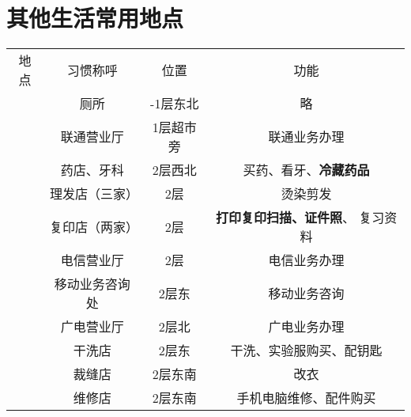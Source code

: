 \section[其他生活常用地点]{其他生活常用地点}
\label{common_locations}
\begin{table}[H]
    \centering
    \begin{tabular}{|c|c|c|c|}
        \Xhline{1.2pt}
        地点                    & 习惯称呼                  & 位置         & 功能                           \\
        \Xhline{1.2pt}
        \multirow{16}{*}{大服}  & 厕所                    & -1层东北      & 略                            \\
        \cline{2-4}
                              & 联通营业厅                 & 1层超市旁      & 联通业务办理                       \\
        \cline{2-4}
                              & 药店、牙科                 & 2层西北       &                              %
        买药、看牙、\textbf{冷藏药品}                                                                       \\
        \cline{2-4}
                              & 理发店（三家）               & 2层         & 烫染剪发                         \\
        \cline{2-4}
                              & 复印店（两家）               & 2层         &                              %
        \textbf{打印复印扫描、证件照}、 复习资料                                                                 \\
        \cline{2-4}
                              & 电信营业厅                 & 2层         & 电信业务办理                       \\
        \cline{2-4}
                              & 移动业务咨询处               & 2层东        & 移动业务咨询                       \\
        \cline{2-4}
                              & 广电营业厅                 & 2层北        & 广电业务办理                       \\
        \cline{2-4}
                              & 干洗店                   & 2层东        & 干洗、实验服购买、配钥匙                 \\
        \cline{2-4}
                              & 裁缝店                   & 2层东南       & 改衣                           \\
        \cline{2-4}
                              & 维修店                   & 2层东南       & 手机电脑维修、配件购买                  \\

\end{tabular}
\end{table}
